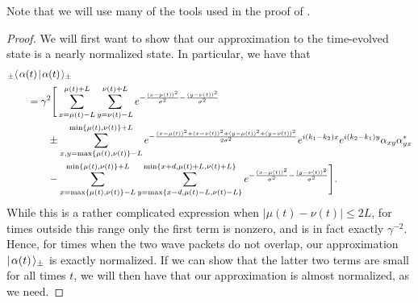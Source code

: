 \documentclass[../thesis-main/thesis-main]{subfiles}
\begin{document}
Note that we will use many of the tools used in the proof of .

\begin{proof}
We will first want to show that our approximation to the time-evolved state is a nearly normalized state.  In particular, we have that
\begin{align}
  &{}_\pm\langle\mspace{2mu} \alpha(t) \mspace{2mu} | \mspace{2mu} \alpha(t)\mspace{2mu} \rangle_\pm \nonumber\\
  &\qquad = \gamma^2 \Bigg[\sum_{x=\mu(t)-L}^{\mu(t)+L} \sum_{y=\nu(t)-L}^{\nu(t)+L} e^{-\frac{(x-\mu(t))^2}{\sigma^2} - \frac{(y-\nu(t))^2}{\sigma^2}} \nonumber\\
  &\qquad \qquad \pm  \sum_{x,y=\max\{\mu(t),\nu(t)\}-L}^{\min\{\mu(t),\nu(t)\}+L} e^{-\frac{(x-\mu(t))^2 + (x-\nu(t))^2 + (y-\mu(t))^2+(y-\nu(t))^2}{2\sigma^2}}e^{i (k_1-k_2) x}e^{i(k_2-k_1)y} \alpha_{xy}\alpha_{yx}^* \nonumber\\
  &\qquad \qquad - \sum_{x=\max\{\mu(t),\nu(t)\}-L}^{\min\{\mu(t),\nu(t)\}+L}\sum_{y=\max\{x-d,\mu(t)-L,\nu(t)-L\}}^{\min\{x+d,\mu(t)+L,\nu(t)+L\}} e^{-\frac{(x-\mu(t))^2}{\sigma^2} - \frac{(y-\nu(t))^2}{\sigma^2}} \Bigg].\label{eq:approximation_ip}
\end{align}
While this is a rather complicated expression when $|\mu(t) - \nu(t)| \leq 2L$, for times outside this range only the first term is nonzero, and is in fact exactly $\gamma^{-2}$.  Hence, for times when the two wave packets do not overlap, our approximation $|\mspace{2mu} \alpha(t) \mspace{2mu} \rangle_{\pm}$ is exactly normalized.  If we can show that the latter two terms are small for all times $t$, we will then have that our approximation is almost normalized, as we need.


\end{proof}
\end{document}
